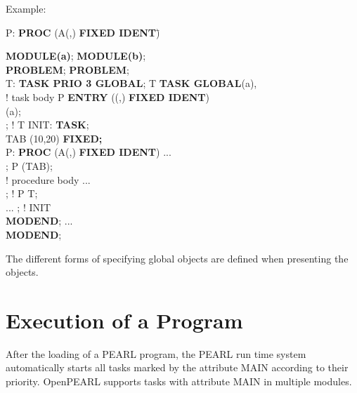 
Example:



\begin{tabbing}
\x P: {\bf PROC} (A(,) {\bf FIXED IDENT})\=  \kill

{\bf MODULE(a)};                  \> {\bf MODULE(b)};\\
{\bf PROBLEM};                    \> {\bf PROBLEM};\\
\x T: {\bf TASK PRIO 3 GLOBAL};   \>  T {\bf TASK GLOBAL}(a),\\
\x \x \x ! task body              \> \x \x P {\bf ENTRY} ((,) {\bf FIXED IDENT}) \\
				  \> \x \x \x \x {\bf GLOBAL}(a);\\
; ! T              \> \x INIT: {\bf TASK};\\
                                  \> \x {} TAB (10,20) {\bf FIXED;}\\
\x P: {\bf PROC} (A(,) {\bf FIXED IDENT}) \> \x \x ...\\
\x \x \x {};         \> \x {} P (TAB);\\
\x \x \x ! procedure body         \> \x \x ... \\
; ! P              \> \x {} T;\\
\x ...                            \> ; ! INIT\\
{\bf MODEND};                     \> \x ...\\
                                  \> {\bf MODEND};
\end{tabbing}

The different forms of specifying global objects are defined when
presenting the objects.

\section{Execution of a Program}   %
\label{sec_program_execution}

After the loading of a PEARL program, the PEARL run time system
automatically starts all tasks marked by the attribute MAIN according
to their priority.  
OpenPEARL supports tasks with attribute MAIN in multiple modules.


